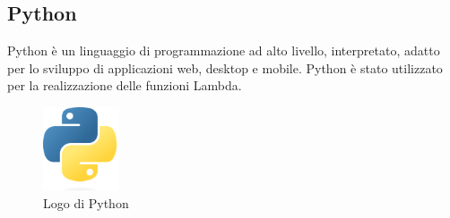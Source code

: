 \subsection{Python}
Python è un linguaggio di programmazione ad alto livello, interpretato, adatto per lo sviluppo di applicazioni web, desktop e mobile. Python è stato utilizzato per la realizzazione delle funzioni Lambda.

\begin{figure}[h]
  \centering
  \includegraphics[width=0.2\textwidth]{img/tecnologie/python.png}
  \caption{Logo di Python}
  \label{fig:python}
\end{figure}